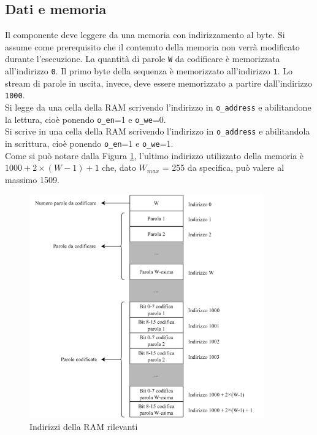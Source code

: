 \documentclass{article}
\begin{document}
\subsection{Dati e memoria}
Il componente deve leggere da una memoria con indirizzamento al byte. Si assume come prerequisito che il contenuto della memoria non verrà modificato durante l'esecuzione. La quantità di parole \verb|W| da codificare è memorizzata all'indirizzo \verb|0|. Il primo byte della sequenza è memorizzato all'indirizzo \verb|1|. Lo stream di parole in uscita, invece, deve essere memorizzato a partire dall'indirizzo \verb|1000|.\\
Si legge da una cella della RAM scrivendo l’indirizzo in \verb|o_address| e abilitandone la lettura, cioè ponendo \verb|o_en|=1 e \verb|o_we|=0. \\
Si scrive in una cella della RAM scrivendo l’indirizzo in \verb|o_address| e abilitandola in scrittura, cioè ponendo \verb|o_en|=1 e \verb|o_we|=1. \\
Come si può notare dalla Figura \ref{fig:Memoria_RAM}, l’ultimo indirizzo utilizzato della memoria è $1000 + 2 \times (W-1) + 1$ che, dato $W_{max}$ = 255 da specifica, può valere al massimo 1509.

\begin{figure}[h]
    \vspace{10pt}
    \centering
    \includegraphics[width=0.9\textwidth]{Resources/Memoria.png}
    \caption{Indirizzi della RAM rilevanti}
    \label{fig:Memoria_RAM}
    \vspace{5pt}
\end{figure}
\end{document}
